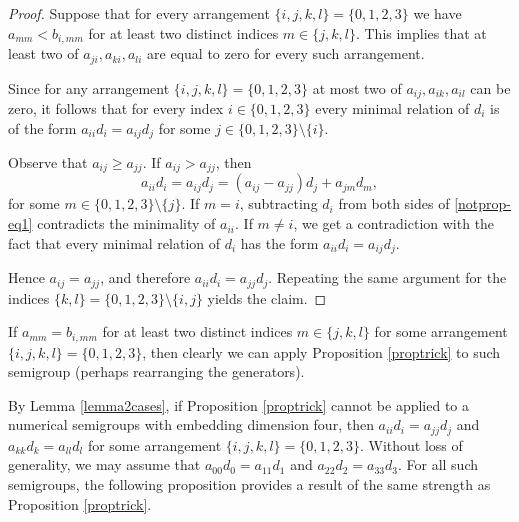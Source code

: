 \documentclass[12pt]{article}
\theoremstyle{remark}
\begin{document}
\begin{proof}
    Suppose that for every arrangement $\{i,j,k,l\} = \{0,1,2,3\}$ we have $a_{mm} < b_{i,mm}$ for at least two distinct indices $m \in \{j,k,l\}$. This implies that at least two of $a_{ji}, a_{ki},a_{li}$ are equal to zero for every such arrangement.

    Since for any arrangement $\{i,j,k,l\} = \{0,1,2,3\} $ at most two of $a_{ij}, a_{ik},a_{il}$ can be zero, it follows that for every index $i \in \{0,1,2,3\}$ every minimal relation of $d_i$ is of the form $a_{ii}d_i = a_{ij}d_j$ for some $j \in \{0,1,2,3\} \setminus \{i\}$. 

    Observe that $a_{ij} \geq a_{jj}$. If $a_{ij} > a_{jj}$, then
    \begin{equation}\label{notprop-eq1}
        a_{ii}d_i = a_{ij}d_j = ( a_{ij}-a_{jj})d_j + a_{jm}d_m,
    \end{equation}
    for some $m \in \{0,1,2,3\} \setminus \{j\}$. If $m = i$, subtracting $d_i$ from both sides of \eqref{notprop-eq1} contradicts the minimality of $a_{ii}$. If $m \neq i$, we get a contradiction with the fact that every minimal relation of $d_i$ has the form $a_{ii}d_i = a_{ij}d_j$. 
    
    Hence $a_{ij} = a_{jj}$, and therefore $a_{ii}d_i = a_{jj}d_j$. Repeating the same argument for the indices $\{k,l\} = \{0,1,2,3\} \setminus \{i,j\}$ yields the claim.
\end{proof}

If $a_{mm} = b_{i,mm}$ for at least two distinct indices $m \in \{j,k,l\}$ for some arrangement $\{i,j,k,l\} = \{0,1,2,3\}$, then clearly we can apply Proposition \ref{proptrick} to such semigroup (perhaps rearranging the generators). 

By Lemma \ref{lemma2cases}, if Proposition \ref{proptrick} cannot be applied to a numerical semigroups with embedding dimension four, then $a_{ii}d_i = a_{jj}d_j$ and $a_{kk}d_k = a_{ll}d_l$ for some arrangement $\{i,j,k,l\} = \{0,1,2,3\}$. Without loss of generality, we may assume that $a_{00}d_0 = a_{11}d_1$ and $a_{22}d_2 = a_{33}d_3$. For all such semigroups, the following proposition provides a result of the same strength as Proposition \ref{proptrick}.  
\end{document}
